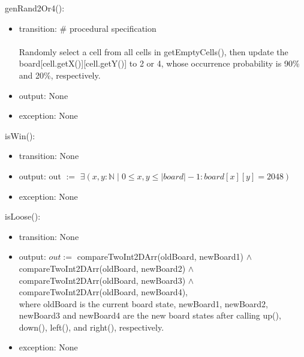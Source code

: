 \documentclass[12pt]{article}
\begin{document}
\noindent genRand2Or4():
\begin{itemize}
\item transition: \# procedural specification\\\\
Randomly select a cell from all cells in getEmptyCells(), then update the board[cell.getX()][cell.getY()] to 2 or 4, whose occurrence probability is 90\% and 20\%, respectively.
\item output: None
\item exception: None
\end{itemize}

\noindent isWin():
\begin{itemize}
\item transition: None
\item output: out $:=$ $\exists(x, y : \mathbb{N} \mid 0 \leq x, y \leq |board| - 1  : board[x][y] = 2048)$
\item exception: None
\end{itemize}

\noindent isLoose():
\begin{itemize}
\item transition: None
\item output: $out :=$ compareTwoInt2DArr(oldBoard, newBoard1) $\land$ compareTwoInt2DArr(oldBoard, newBoard2) $\land$ compareTwoInt2DArr(oldBoard, newBoard3) $\land$ compareTwoInt2DArr(oldBoard, newBoard4), \\
where oldBoard is the current board state, newBoard1, newBoard2, newBoard3 and newBoard4 are the new board states after calling up(), down(), left(), and right(), respectively.
\item exception: None
\end{itemize}
\end{document}

